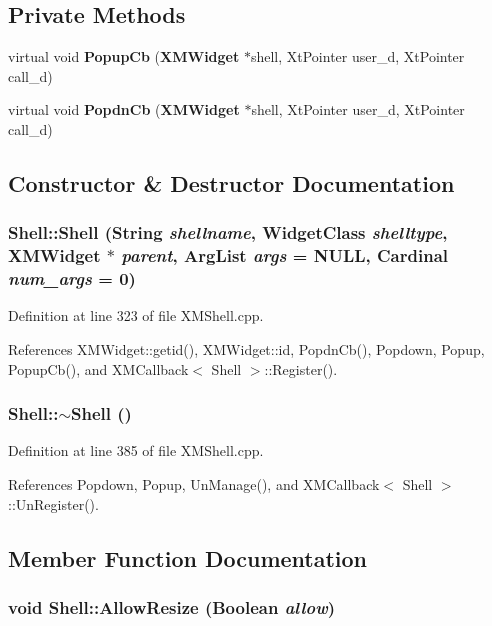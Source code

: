 \subsection*{Private Methods}
\begin{CompactItemize}
\item 
virtual void {\bf Popup\-Cb} ({\bf XMWidget} $\ast$shell, Xt\-Pointer user\_\-d, Xt\-Pointer call\_\-d)
\item 
virtual void {\bf Popdn\-Cb} ({\bf XMWidget} $\ast$shell, Xt\-Pointer user\_\-d, Xt\-Pointer call\_\-d)
\end{CompactItemize}


\subsection{Constructor \& Destructor Documentation}
\subsubsection{\setlength{\rightskip}{0pt plus 5cm}Shell::Shell (String {\em shellname}, Widget\-Class {\em shelltype}, {\bf XMWidget} $\ast$ {\em parent}, Arg\-List {\em args} = NULL, Cardinal {\em num\_\-args} = 0)}\label{classShell_a0}




Definition at line 323 of file XMShell.cpp.

References XMWidget::getid(), XMWidget::id, Popdn\-Cb(), Popdown, Popup, Popup\-Cb(), and XMCallback$<$ Shell $>$::Register().
\subsubsection{\setlength{\rightskip}{0pt plus 5cm}Shell::$\sim$Shell ()}\label{classShell_a1}




Definition at line 385 of file XMShell.cpp.

References Popdown, Popup, Un\-Manage(), and XMCallback$<$ Shell $>$::Un\-Register().

\subsection{Member Function Documentation}
\subsubsection{\setlength{\rightskip}{0pt plus 5cm}void Shell::Allow\-Resize (Boolean {\em allow})\hspace{0.3cm}{\tt  [inline]}}\label{classShell_a2}




